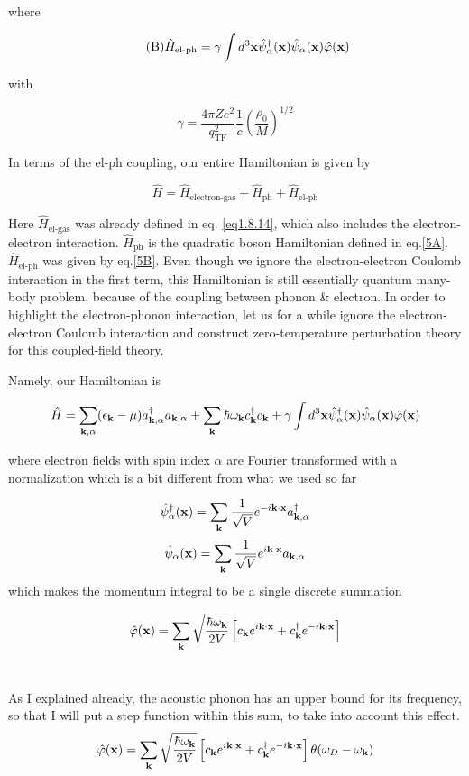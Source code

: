 where

\begin{align}\tag{B}\label{5B}
\hat{H}_{\text{el-ph}} = \gamma\int d^3{\bf x}\hat{\psi}_{\alpha}^\dagger({\bf x})\hat{\psi}_{\alpha}({\bf x})\hat\varphi({\bf x})
\end{align}

with

\[\gamma = \frac{4\pi Ze^2}{q_{\text{TF}}^2}\frac{1}{c}\left(\frac{\rho_0}{M}\right)^{1/2} \]

In terms of the el-ph coupling, our entire Hamiltonian is given by

\[\hat{H}=\hat{H}_{\text{electron-gas}}+\hat{H}_{\text{ph}}+\hat{H}_{\text{el-ph}} \]

Here $\hat{H}_{\text{el-gas}}$ was already defined in eq. \eqref{eq1.8.14}, which also includes the electron-electron interaction. $\hat{H}_{\text{ph}}$ is the quadratic boson Hamiltonian defined in eq.\eqref{5A}. $\hat{H}_{\text{el-ph}}$ was given by eq.\eqref{5B}. Even though we ignore the electron-electron Coulomb interaction in the first term, this Hamiltonian is still essentially quantum many-body problem, because of the coupling between phonon \& electron. In order to highlight the electron-phonon interaction, let us for a while ignore the electron-electron Coulomb interaction and construct zero-temperature perturbation theory for this coupled-field theory.

Namely, our Hamiltonian is

\[\hat{H} = \sum_{\bf k,\alpha}(\epsilon_{\bf k}-\mu)a^\dagger_{\bf k,\alpha}a_{\bf k,\alpha} + \sum_{\bf k}\hbar\omega_{\bf k}c_{\bf k}^\dagger c_{\bf k} + \gamma\int d^3{\bf x}\hat\psi_\alpha^\dagger({\bf x})\hat\psi_\alpha({\bf x})\hat\varphi({\bf x}) \]

where electron fields with spin index $\alpha$ are Fourier transformed with a normalization which is a bit different from what we used so far

\[\hat\psi_\alpha^\dagger({\bf x}) = \sum_{\bf k}\frac{1}{\sqrt{V}}e^{-i\bf k\cdot x}a^\dagger_{\bf k,\alpha} \]
\[\hat\psi_\alpha({\bf x}) = \sum_{\bf k}\frac{1}{\sqrt{V}}e^{i\bf k\cdot x}a_{\bf k,\alpha} \]
which makes the momentum integral to be a single discrete summation

\[\hat\varphi({\bf x})=\sum_{\bf k}\sqrt{\frac{\hbar\omega_{\bf k}}{2V}}\left[c_{\bf k}e^{i\bf k\cdot x}+c_{\bf k}^\dagger e^{-i\bf k\cdot x}\right] \]
\dotfill
\

As I explained already, the acoustic phonon has an upper bound for its frequency, so that I will put a step function within this sum, to take into account this effect.
\[\hat\varphi({\bf x})=\sum_{\bf k}\sqrt{\frac{\hbar\omega_{\bf k}}{2V}}\left[c_{\bf k}e^{i\bf k\cdot x}+c_{\bf k}^\dagger e^{-i\bf k\cdot x}\right] \theta(\omega_D-\omega_{\bf k}) \]
\dotfill

